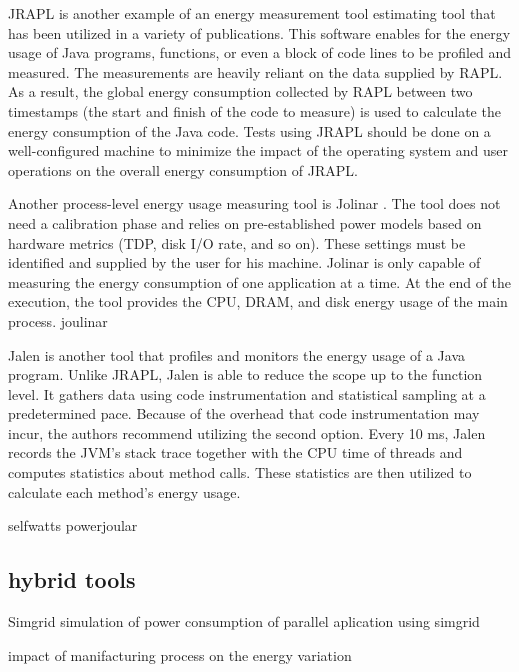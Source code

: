 JRAPL is another example of an energy measurement tool estimating tool that has been utilized in a variety of publications\cite{guimaraes2016some,liu2015data}.
This software enables for the energy usage of Java programs, functions, or even a block of code lines to be profiled and measured.
The measurements are heavily reliant on the data supplied by RAPL.
As a result, the global energy consumption collected by RAPL between two timestamps (the start and finish of the code to measure) is used to calculate the energy consumption of the Java code.
Tests using JRAPL should be done on a well-configured machine to minimize the impact of the operating system and user operations on the overall energy consumption of JRAPL.

Another process-level energy usage measuring tool is Jolinar \cite{islam2016measuring,noureddine2016jolinar}.
The tool does not need a calibration phase and relies on pre-established power models based on hardware metrics (TDP, disk I/O rate, and so on).
These settings must be identified and supplied by the user for his machine.
Jolinar is only capable of measuring the energy consumption of one application at a time.
At the end of the execution, the tool provides the CPU, DRAM, and disk energy usage of the main process.
joulinar

Jalen\cite{noureddine2015monitoring} is another tool that profiles and monitors the energy usage of a Java program. Unlike JRAPL, Jalen is able to reduce the scope up to the function level.
It gathers data using code instrumentation and statistical sampling at a predetermined pace.
Because of the overhead that code instrumentation may incur, the authors recommend utilizing the second option.
Every 10 ms, Jalen records the JVM's stack trace together with the CPU time of threads and computes statistics about method calls.
These statistics are then utilized to calculate each method's energy usage.

selfwatts \cite{fieni2021selfwatts}
powerjoular \cite{noureddine2022powerjoular}

\subsection{hybrid tools}

Simgrid simulation of power consumption of parallel aplication using simgrid \cite{heinrich2017predicting}

impact of manifacturing process on the energy variation \cite{coles2014comparing}

